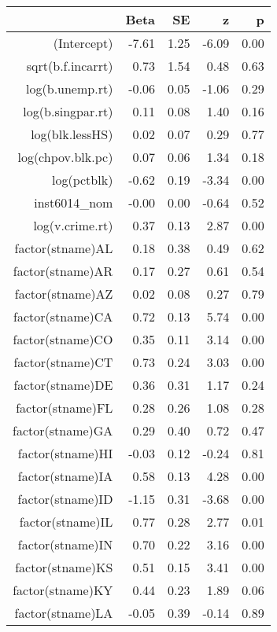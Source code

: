 \begin{table}[ht]
\centering
\begin{tabular}{rrrrr}
  \hline
 & Beta & SE & z & p \\ 
  \hline
(Intercept) & -7.61 & 1.25 & -6.09 & 0.00 \\ 
  sqrt(b.f.incarrt) & 0.73 & 1.54 & 0.48 & 0.63 \\ 
  log(b.unemp.rt) & -0.06 & 0.05 & -1.06 & 0.29 \\ 
  log(b.singpar.rt) & 0.11 & 0.08 & 1.40 & 0.16 \\ 
  log(blk.lessHS) & 0.02 & 0.07 & 0.29 & 0.77 \\ 
  log(chpov.blk.pc) & 0.07 & 0.06 & 1.34 & 0.18 \\ 
  log(pctblk) & -0.62 & 0.19 & -3.34 & 0.00 \\ 
  inst6014\_nom & -0.00 & 0.00 & -0.64 & 0.52 \\ 
  log(v.crime.rt) & 0.37 & 0.13 & 2.87 & 0.00 \\ 
  factor(stname)AL & 0.18 & 0.38 & 0.49 & 0.62 \\ 
  factor(stname)AR & 0.17 & 0.27 & 0.61 & 0.54 \\ 
  factor(stname)AZ & 0.02 & 0.08 & 0.27 & 0.79 \\ 
  factor(stname)CA & 0.72 & 0.13 & 5.74 & 0.00 \\ 
  factor(stname)CO & 0.35 & 0.11 & 3.14 & 0.00 \\ 
  factor(stname)CT & 0.73 & 0.24 & 3.03 & 0.00 \\ 
  factor(stname)DE & 0.36 & 0.31 & 1.17 & 0.24 \\ 
  factor(stname)FL & 0.28 & 0.26 & 1.08 & 0.28 \\ 
  factor(stname)GA & 0.29 & 0.40 & 0.72 & 0.47 \\ 
  factor(stname)HI & -0.03 & 0.12 & -0.24 & 0.81 \\ 
  factor(stname)IA & 0.58 & 0.13 & 4.28 & 0.00 \\ 
  factor(stname)ID & -1.15 & 0.31 & -3.68 & 0.00 \\ 
  factor(stname)IL & 0.77 & 0.28 & 2.77 & 0.01 \\ 
  factor(stname)IN & 0.70 & 0.22 & 3.16 & 0.00 \\ 
  factor(stname)KS & 0.51 & 0.15 & 3.41 & 0.00 \\ 
  factor(stname)KY & 0.44 & 0.23 & 1.89 & 0.06 \\ 
  factor(stname)LA & -0.05 & 0.39 & -0.14 & 0.89 \\ 

\end{tabular}
\end{table}
